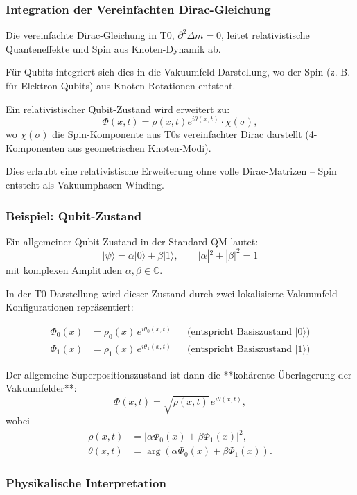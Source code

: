 	\subsubsection{Integration der Vereinfachten Dirac-Gleichung}
	
	Die vereinfachte Dirac-Gleichung in T0, $\partial^2 \Delta m = 0$, leitet relativistische Quanteneffekte und Spin aus Knoten-Dynamik ab.
	
	Für Qubits integriert sich dies in die Vakuumfeld-Darstellung, wo der Spin (z. B. für Elektron-Qubits) aus Knoten-Rotationen entsteht.
	
	Ein relativistischer Qubit-Zustand wird erweitert zu:
	\[
	\Phi(x,t) = \rho(x,t) e^{i\theta(x,t)} \cdot \chi(\sigma),
	\]
	wo $\chi(\sigma)$ die Spin-Komponente aus T0s vereinfachter Dirac darstellt (4-Komponenten aus geometrischen Knoten-Modi).
	
	Dies erlaubt eine relativistische Erweiterung ohne volle Dirac-Matrizen – Spin entsteht als Vakuumphasen-Winding.
	
	\subsubsection{Beispiel: Qubit-Zustand}
	
	Ein allgemeiner Qubit-Zustand in der Standard-QM lautet:
	\[
	|\psi\rangle = \alpha |0\rangle + \beta |1\rangle, \qquad |\alpha|^2 + |\beta|^2 = 1
	\]
	mit komplexen Amplituden $\alpha, \beta \in \mathbb{C}$.
	
	In der T0-Darstellung wird dieser Zustand durch zwei lokalisierte Vakuumfeld-Konfigurationen repräsentiert:
	
	\begin{align}
		\Phi_0(x) &= \rho_0(x) \, e^{i \theta_0(x,t)} && \text{(entspricht Basiszustand } |0\rangle\text{)} \\
		\Phi_1(x) &= \rho_1(x) \, e^{i \theta_1(x,t)} && \text{(entspricht Basiszustand } |1\rangle\text{)}
	\end{align}
	
	Der allgemeine Superpositionszustand ist dann die **kohärente Überlagerung der Vakuumfelder**:
	\[
	\Phi(x,t) = \sqrt{\rho(x,t)} \, e^{i \theta(x,t)},
	\]
	wobei
	\begin{align}
		\rho(x,t) &= |\alpha \Phi_0(x) + \beta \Phi_1(x)|^2, \\
		\theta(x,t) &= \arg(\alpha \Phi_0(x) + \beta \Phi_1(x)).
	\end{align}
	
	\subsubsection{Physikalische Interpretation}
	
